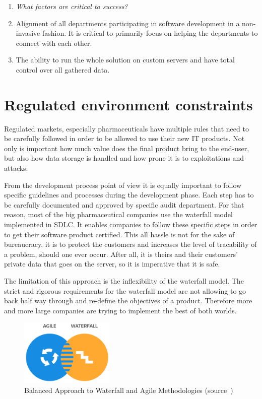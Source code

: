 \begin{enumerate}
	\item \emph{What factors are critical to success?	}
	\item[] Alignment of all departments participating in software development in a non-invasive fashion. It is critical to primarily focus on helping the departments to connect with each other.
	\item[] The ability to run the whole solution on custom servers and have total control over all gathered data.
	
\end{enumerate}


\section{Regulated environment constraints}

Regulated markets, especially pharmaceuticals have multiple rules that need to be carefully followed in order to be allowed to use their new IT products. Not only is important how much value does the final product bring to the end-user, but also how data storage is handled and how prone it is to exploitations and attacks. 

From the development process point of view it is equally important to follow specific guidelines and processes during the development phase. Each step has to be carefully documented and approved by specific audit department. For that reason, most of the big pharmaceutical companies use the waterfall model implemented in SDLC. It enables companies to follow these specific steps in order to get their software product certified. This all hassle is not for the sake of bureaucracy, it is to protect the customers and increases the level of tracability of a problem, should one ever occur. After all, it is theirs and their customers' private data that goes on the server, so it is imperative that it is safe.

The limitation of this approach is the inflexibility of the waterfall model. The strict and rigorous requirements for the waterfall model are not allowing to go back half way through and re-define the objectives of a product. Therefore more and more large companies are trying to implement the best of both worlds.

\begin{figure}[!ht]
	\centering
	\includegraphics[width=0.4\textwidth]{figures/02_analysis/agile-waterfall}
    \caption[Balanced Approach to Waterfall and Agile Methodologies]{Balanced Approach to Waterfall and Agile Methodologies (source~\protect\cite{agile-waterfall})}
\end{figure}

